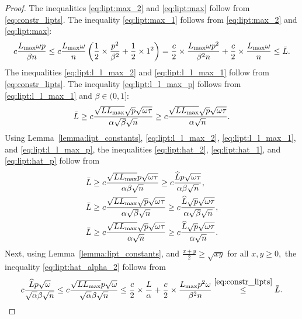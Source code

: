 \documentclass{article} %
\theoremstyle{plain}
\theoremstyle{definition}
\theoremstyle{remark}
\begin{document}
\begin{proof}
  The inequalities \eqref{eq:lipt:max_2} and \eqref{eq:lipt:max} follow from \eqref{eq:constr_lipts}. 
  The inequality \eqref{eq:lipt:max_1} follows from \eqref{eq:lipt:max_2} and \eqref{eq:lipt:max}:
  \begin{align*}
    c \frac{L_{\max} \omega p}{\beta n} \leq c \frac{L_{\max} \omega}{n} \left(\frac{1}{2} \times \frac{p^2}{\beta^2} + \frac{1}{2} \times 1^2\right) = \frac{c}{2} \times \frac{L_{\max} \omega p^2}{\beta^2 n} + \frac{c}{2} \times \frac{L_{\max} \omega}{n} \leq \bar{L}.
  \end{align*}
  The inequalities \eqref{eq:lipt:l_l_max_2} and \eqref{eq:lipt:l_l_max_1} follow from \eqref{eq:constr_lipts}. The inequality \eqref{eq:lipt:l_l_max_p} follows from \eqref{eq:lipt:l_l_max_1} and $\beta \in (0, 1]$:
  \begin{align*}
    \bar{L} \geq c\frac{\sqrt{L L_{\max}} \sqrt{p} \sqrt{\omega \tau}}{\alpha \sqrt{\beta} \sqrt{n}} \geq c\frac{\sqrt{L L_{\max}} \sqrt{p} \sqrt{\omega \tau}}{\alpha \sqrt{n}}.
  \end{align*}
  Using Lemma~\ref{lemma:lipt_constants}, \eqref{eq:lipt:l_l_max_2}, \eqref{eq:lipt:l_l_max_1}, and \eqref{eq:lipt:l_l_max_p}, the inequalities \eqref{eq:lipt:hat_2}, \eqref{eq:lipt:hat_1}, and \eqref{eq:lipt:hat_p} follow from
  \begin{align*}
    &\bar{L} \geq c\frac{\sqrt{L L_{\max}} p \sqrt{\omega \tau}}{\alpha \beta \sqrt{n}} \geq c\frac{\widehat{L} p \sqrt{\omega \tau}}{\alpha \beta \sqrt{n}},\\
    &\bar{L} \geq c\frac{\sqrt{L L_{\max}} \sqrt{p} \sqrt{\omega \tau}}{\alpha \sqrt{\beta} \sqrt{n}} \geq c\frac{\widehat{L} \sqrt{p} \sqrt{\omega \tau}}{\alpha \sqrt{\beta} \sqrt{n}},\\
    &\bar{L} \geq c\frac{\sqrt{L L_{\max}} \sqrt{p} \sqrt{\omega \tau}}{\alpha \sqrt{n}} \geq c\frac{\widehat{L} \sqrt{p} \sqrt{\omega \tau}}{\alpha \sqrt{n}}.
  \end{align*}
  Next, using Lemma~\ref{lemma:lipt_constants}, and $\frac{x+y}{2} \geq \sqrt{x y}$ for all $x, y \geq 0,$ the inequality \eqref{eq:lipt:hat_alpha_2} follows from
  \begin{align*}
    \constlipt\frac{\widehat{L} p \sqrt{\omega}}{\sqrt{\alpha} \beta \sqrt{n}} \leq \constlipt\frac{\sqrt{L L_{\max}} p \sqrt{\omega}}{\sqrt{\alpha} \beta \sqrt{n}} \leq \frac{\constlipt}{2} \times \frac{L}{\alpha} + \frac{\constlipt}{2} \times \frac{L_{\max} p^2 \omega}{\beta^2 n} \overset{\eqref{eq:constr_lipts}}{\leq} \bar{L}.

\end{align*}
\end{proof}
\end{document}

